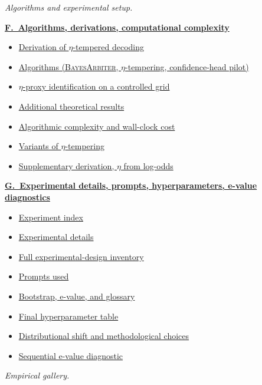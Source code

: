 \begin{tcolorbox}
{\textit{Algorithms and experimental setup.}

\textbf{\hyperref[app:letter-F]{F.\ Algorithms, derivations, computational complexity}}
\begin{itemize}
  \item \hyperref[app:eta-tempering-derivation]{Derivation of $\eta$-tempered decoding}
  \item \hyperref[app:algorithms]{Algorithms (\textsc{BayesArbiter}, $\eta$-tempering, confidence-head pilot)}
  \item \hyperref[app:eta-proxy-id]{$\eta$-proxy identification on a controlled grid}
  \item \hyperref[app:additional-theory]{Additional theoretical results}
  \item \hyperref[app:complexity]{Algorithmic complexity and wall-clock cost}
  \item \hyperref[app:eta-variants]{Variants of $\eta$-tempering}
  \item \hyperref[app:eta-from-logodds]{Supplementary derivation, $\eta$ from log-odds}
\end{itemize}

\textbf{\hyperref[app:letter-G]{G.\ Experimental details, prompts, hyperparameters, e-value diagnostics}}
\begin{itemize}
  \item \hyperref[app:experiment-index]{Experiment index}
  \item \hyperref[app:experimental-details]{Experimental details}
  \item \hyperref[app:exp-design-inventory]{Full experimental-design inventory}
  \item \hyperref[app:prompts]{Prompts used}
  \item \hyperref[app:bootstrap-evalue]{Bootstrap, e-value, and glossary}
  \item \hyperref[app:final-hyperparam]{Final hyperparameter table}
  \item \hyperref[app:dist-shift]{Distributional shift and methodological choices}
  \item \hyperref[app:evalue-diagnostic]{Sequential e-value diagnostic}
\end{itemize}

\textit{Empirical gallery.}

}
\end{tcolorbox}
